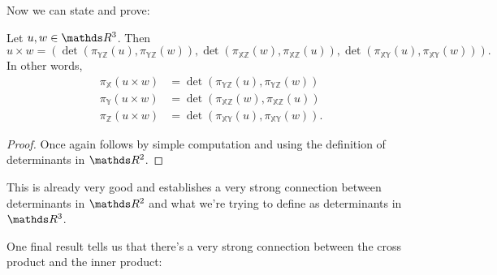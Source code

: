 Now we can state and prove:

\begin{lemma}
	Let $u,w\in \R^3$. Then
	\[u\times w=\left(\det(\pi_{\mathds {YZ}}(u),\pi_{\mathds {YZ}}(w)),\det(\pi_{\mathds {XZ}}(w),\pi_{\mathds {XZ}}(u)),\det(\pi_{\mathds {XY}}(u),\pi_{\mathds {XY}}(w))\right).\]In other words,
	\begin{align*}
		\pi_{\mathds X}(u\times w)&=\det(\pi_{\mathds {YZ}}(u),\pi_{\mathds {YZ}}(w))\\
		\pi_{\mathds Y}(u\times w)&=\det(\pi_{\mathds {XZ}}(w),\pi_{\mathds {XZ}}(u))\\
		\pi_{\mathds Z}(u\times w)&=\det(\pi_{\mathds {XY}}(u),\pi_{\mathds {XY}}(w)).
	\end{align*}
\end{lemma}
\begin{proof}
	Once again follows by simple computation and using the definition of determinants in $\R^2$.
\end{proof}

This is already very good and establishes a very strong connection between determinants in $\R^2$ and what we're trying to define as determinants in $\R^3$.

One final result tells us that there's a very strong connection between the cross product and the inner product:

